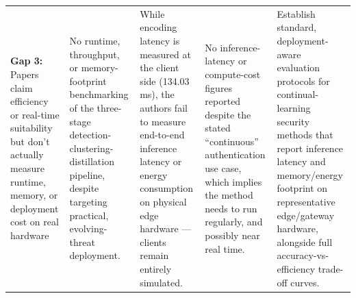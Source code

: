 \documentclass[10pt]{article}
\begin{document}
\begin{landscape}
\begin{longtable}{
	L{3.2cm} L{4.2cm} L{4.2cm} L{4.2cm} L{4.6cm}
}
\textbf{Gap 3:} Papers claim efficiency or real-time suitability but don't actually measure runtime, memory, or deployment cost on real hardware &
No runtime, throughput, or memory-footprint benchmarking of the three-stage detection-clustering-distillation pipeline, despite targeting practical, evolving-threat deployment. &
While encoding latency is measured at the client side (134.03 ms), the authors fail to measure end-to-end inference latency or energy consumption on physical edge hardware --- clients remain entirely simulated. &
No inference-latency or compute-cost figures reported despite the stated \enquote{continuous} authentication use case, which implies the method needs to run regularly, and possibly near real time. &
Establish standard, deployment-aware evaluation protocols for continual-learning security methods that report inference latency and memory/energy footprint on representative edge/gateway hardware, alongside full accuracy-vs-efficiency trade-off curves. \\

\end{longtable}
\end{landscape}
\restoregeometry
\end{document}
